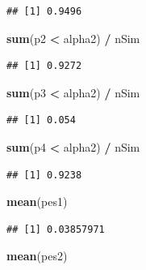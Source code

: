 \documentclass[]{book}
\newenvironment{Shaded}{\begin{snugshade}}{\end{snugshade}}
\newcommand{\KeywordTok}[1]{\textcolor[rgb]{0.13,0.29,0.53}{\textbf{#1}}}
\newcommand{\NormalTok}[1]{#1}
\newcommand{\OperatorTok}[1]{\textcolor[rgb]{0.81,0.36,0.00}{\textbf{#1}}}
\newcommand{\StringTok}[1]{\textcolor[rgb]{0.31,0.60,0.02}{#1}}
\begin{document}
\begin{verbatim}
## [1] 0.9496
\end{verbatim}

\begin{Shaded}
\begin{Highlighting}[]
\KeywordTok{sum}\NormalTok{(p2 }\OperatorTok{<}\StringTok{ }\NormalTok{alpha2) }\OperatorTok{/}\StringTok{ }\NormalTok{nSim}
\end{Highlighting}
\end{Shaded}

\begin{verbatim}
## [1] 0.9272
\end{verbatim}

\begin{Shaded}
\begin{Highlighting}[]
\KeywordTok{sum}\NormalTok{(p3 }\OperatorTok{<}\StringTok{ }\NormalTok{alpha2) }\OperatorTok{/}\StringTok{ }\NormalTok{nSim}
\end{Highlighting}
\end{Shaded}

\begin{verbatim}
## [1] 0.054
\end{verbatim}

\begin{Shaded}
\begin{Highlighting}[]
\KeywordTok{sum}\NormalTok{(p4 }\OperatorTok{<}\StringTok{ }\NormalTok{alpha2) }\OperatorTok{/}\StringTok{ }\NormalTok{nSim}
\end{Highlighting}
\end{Shaded}

\begin{verbatim}
## [1] 0.9238
\end{verbatim}

\begin{Shaded}
\begin{Highlighting}[]
\KeywordTok{mean}\NormalTok{(pes1)}
\end{Highlighting}
\end{Shaded}

\begin{verbatim}
## [1] 0.03857971
\end{verbatim}

\begin{Shaded}
\begin{Highlighting}[]
\KeywordTok{mean}\NormalTok{(pes2)}
\end{Highlighting}
\end{Shaded}
\end{document}
